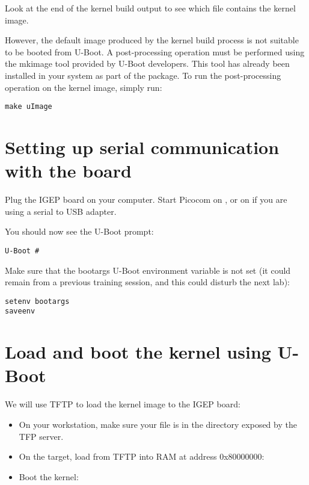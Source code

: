 Look at the end of the kernel build output to see which file contains
the kernel image.

However, the default image produced by the kernel build process is not
suitable to be booted from U-Boot. A post-processing operation must be
performed using the mkimage tool provided by U-Boot developers. This
tool has already been installed in your system as part of the
 package. To run the post-processing operation on
the kernel image, simply run:

\begin{verbatim}
make uImage
\end{verbatim}

\section{Setting up serial communication with the board}

Plug the IGEP board on your computer. Start Picocom on
, or on  if you are using a serial
to USB adapter.

You should now see the U-Boot prompt:

\begin{verbatim}
U-Boot #
\end{verbatim}

Make sure that the bootargs U-Boot environment variable is not set (it
could remain from a previous training session, and this could disturb
the next lab):

\begin{verbatim}
setenv bootargs
saveenv
\end{verbatim}

\section{Load and boot the kernel using U-Boot}

We will use TFTP to load the kernel image to the IGEP board:

\begin{itemize}

\item On your workstation, make sure your  file is in the
  directory exposed by the TFP server.

\item On the target, load  from TFTP into RAM at address
  0x80000000:\\

\item Boot the kernel:\\

\end{itemize}

